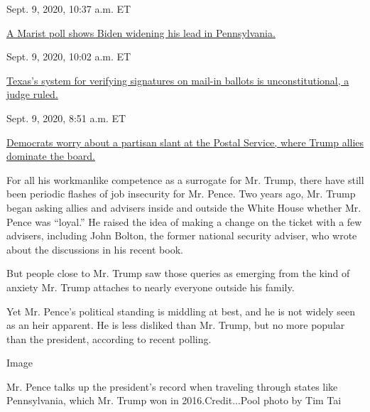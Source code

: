\href{https://www.nytimes3xbfgragh.onion/live/2020/09/09/us/trump-vs-biden\#a-marist-poll-shows-biden-widening-his-lead-in-pennsylvania}{}

Sept. 9, 2020, 10:37 a.m. ET

\href{https://www.nytimes3xbfgragh.onion/live/2020/09/09/us/trump-vs-biden\#a-marist-poll-shows-biden-widening-his-lead-in-pennsylvania}{A
Marist poll shows Biden widening his lead in
Pennsylvania.}\href{https://www.nytimes3xbfgragh.onion/live/2020/09/09/us/trump-vs-biden\#texass-system-for-verifying-signatures-on-mail-in-ballots-is-unconstitutional-a-judge-ruled}{}

Sept. 9, 2020, 10:02 a.m. ET

\href{https://www.nytimes3xbfgragh.onion/live/2020/09/09/us/trump-vs-biden\#texass-system-for-verifying-signatures-on-mail-in-ballots-is-unconstitutional-a-judge-ruled}{Texas's
system for verifying signatures on mail-in ballots is unconstitutional,
a judge
ruled.}\href{https://www.nytimes3xbfgragh.onion/live/2020/09/09/us/trump-vs-biden\#democrats-worry-about-a-partisan-slant-at-the-postal-service-where-trump-allies-dominate-the-board}{}

Sept. 9, 2020, 8:51 a.m. ET

\href{https://www.nytimes3xbfgragh.onion/live/2020/09/09/us/trump-vs-biden\#democrats-worry-about-a-partisan-slant-at-the-postal-service-where-trump-allies-dominate-the-board}{Democrats
worry about a partisan slant at the Postal Service, where Trump allies
dominate the board.}

For all his workmanlike competence as a surrogate for Mr. Trump, there
have still been periodic flashes of job insecurity for Mr. Pence. Two
years ago, Mr. Trump began asking allies and advisers inside and outside
the White House whether Mr. Pence was ``loyal.'' He raised the idea of
making a change on the ticket with a few advisers, including John
Bolton, the former national security adviser, who wrote about the
discussions in his recent book.

But people close to Mr. Trump saw those queries as emerging from the
kind of anxiety Mr. Trump attaches to nearly everyone outside his
family.

Yet Mr. Pence's political standing is middling at best, and he is not
widely seen as an heir apparent. He is less disliked than Mr. Trump, but
no more popular than the president, according to recent polling.

Image

Mr. Pence talks up the president's record when traveling through states
like Pennsylvania, which Mr. Trump won in 2016.Credit...Pool photo by
Tim Tai


